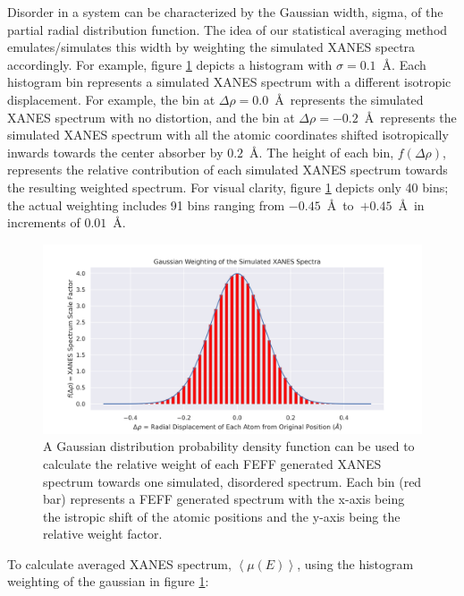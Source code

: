 Disorder in a system can be characterized by the Gaussian width, sigma, of the partial radial distribution function. The idea of our statistical averaging method emulates/simulates this width by weighting the simulated XANES spectra accordingly. For example, figure \ref{fig:gaussian-weighting-hist} depicts a histogram with $ \sigma=0.1 $~\AA. Each histogram bin represents a simulated XANES spectrum with a different isotropic displacement. For example, the bin at $ \Delta\rho=0.0 $~\AA~represents the simulated XANES spectrum with no distortion, and the bin at $ \Delta\rho=-0.2 $~\AA~represents the simulated XANES spectrum with all the atomic coordinates shifted isotropically inwards towards the center absorber by $ 0.2 $~\AA. The height of each bin, $ f(\Delta\rho) $, represents the relative contribution of each simulated XANES spectrum towards the resulting weighted spectrum. For visual clarity, figure \ref{fig:gaussian-weighting-hist} depicts only 40 bins; the actual weighting includes 91 bins ranging from $ -0.45 $~\AA~to~$ +0.45 $~\AA~in increments of $ 0.01 $~\AA. 

\begin{figure}[h!]
	\centering
	\includegraphics[width=\linewidth]{Chapters/Figures/gaussian-weighting-hist.png}
	\caption[Simulated Spectrum Gaussian Weighting]{A Gaussian distribution probability density function can be used to calculate the relative weight of each FEFF generated XANES spectrum towards one simulated, disordered spectrum. Each bin (red bar) represents a FEFF generated spectrum with the x-axis being the istropic shift of the atomic positions and the y-axis being the relative weight factor.}
	\label{fig:gaussian-weighting-hist}
\end{figure}

To calculate averaged XANES spectrum, $ \left\langle \mu(E) \right\rangle $, using the histogram weighting of the gaussian in figure \ref{fig:gaussian-weighting-hist}:

